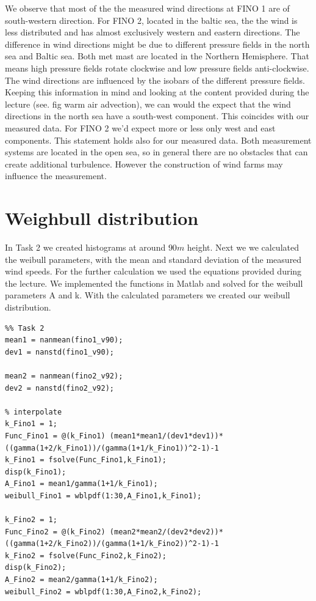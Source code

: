 \documentclass[10pt]{article}
\begin{document}
We observe that most of the the measured wind directions at FINO 1 are of south-western direction. For FINO 2, located in the baltic sea, the the wind is less distributed and has almost exclusively western and eastern directions. The difference in wind directions might be due to different pressure fields in the north sea and Baltic sea. Both met mast are located in the Northern Hemisphere. That means high pressure fields rotate clockwise and low pressure fields anti-clockwise. The wind directions are influenced by the isobars of the different pressure fields. Keeping this information in mind and looking at the content provided during the lecture (see. fig warm air advection), we can would the expect that the wind directions in the north sea have a south-west component. This coincides with our measured data. For FINO 2 we'd expect more or less only west and east components. This statement holds also for our measured data.
Both measurement systems are located in the open sea, so in general there are no obstacles that can create additional turbulence. However the construction of wind farms may influence the measurement.
\newpage
\section{Weighbull distribution}
In Task 2 we created histograms at around $90m$ height. Next we we calculated the weibull parameters, with the mean and standard deviation of the measured wind speeds. For the further calculation we used the equations provided during the lecture. We implemented the functions in Matlab and solved for the weibull parameters A and k. With the calculated parameters we created our weibull distribution.


\begin{lstlisting}
%% Task 2
mean1 = nanmean(fino1_v90);
dev1 = nanstd(fino1_v90);

mean2 = nanmean(fino2_v92);
dev2 = nanstd(fino2_v92);

% interpolate
k_Fino1 = 1;
Func_Fino1 = @(k_Fino1) (mean1*mean1/(dev1*dev1))*((gamma(1+2/k_Fino1))/(gamma(1+1/k_Fino1))^2-1)-1 
k_Fino1 = fsolve(Func_Fino1,k_Fino1);
disp(k_Fino1);
A_Fino1 = mean1/gamma(1+1/k_Fino1);
weibull_Fino1 = wblpdf(1:30,A_Fino1,k_Fino1);

k_Fino2 = 1;
Func_Fino2 = @(k_Fino2) (mean2*mean2/(dev2*dev2))*((gamma(1+2/k_Fino2))/(gamma(1+1/k_Fino2))^2-1)-1 
k_Fino2 = fsolve(Func_Fino2,k_Fino2);
disp(k_Fino2);
A_Fino2 = mean2/gamma(1+1/k_Fino2);
weibull_Fino2 = wblpdf(1:30,A_Fino2,k_Fino2);
\end{lstlisting}
\end{document}
